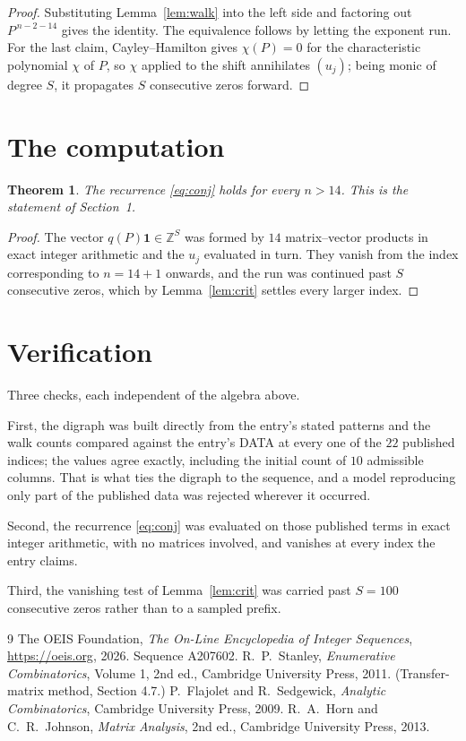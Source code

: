 \documentclass[11pt,a4paper]{article}
\theoremstyle{plain}
\newtheorem{theorem}{Theorem}
\theoremstyle{definition}
\begin{document}
\begin{proof}
Substituting Lemma~\ref{lem:walk} into the left side and factoring out
$P^{\,n-2-14}$ gives the identity. The equivalence follows by letting the exponent
run. For the last claim, Cayley--Hamilton gives $\chi(P)=0$ for the characteristic
polynomial $\chi$ of $P$, so $\chi$ applied to the shift annihilates $(u_j)$; being monic of
degree $S$, it propagates $S$ consecutive zeros forward.
\end{proof}

\section{The computation}

\begin{theorem}
The recurrence \eqref{eq:conj} holds for every $n>14$. This is the statement of
Section~1.
\end{theorem}

\begin{proof}
The vector $q(P)\mathbf{1}\in\mathbb{Z}^{S}$ was formed by $14$ matrix--vector
products in exact integer arithmetic and the $u_j$ evaluated in turn. They vanish from the
index corresponding to $n=14+1$ onwards, and the run was continued past $S$ consecutive
zeros, which by Lemma~\ref{lem:crit} settles every larger index.
\end{proof}

\section{Verification}

Three checks, each independent of the algebra above.

First, the digraph was built directly from the entry's stated patterns and the walk counts
compared against the entry's DATA at every one of the $22$ published indices; the
values agree exactly, including the initial count of $10$ admissible columns. That is
what ties the digraph to the sequence, and a model reproducing only part of the published
data was rejected wherever it occurred.

Second, the recurrence \eqref{eq:conj} was evaluated on those published terms in exact
integer arithmetic, with no matrices involved, and vanishes at every index the entry claims.

Third, the vanishing test of Lemma~\ref{lem:crit} was carried past $S=100$ consecutive
zeros rather than to a sampled prefix.

\begin{thebibliography}{9}
 The OEIS Foundation, \emph{The On-Line Encyclopedia of Integer
Sequences}, \url{https://oeis.org}, 2026. Sequence A207602.
 R.~P.~Stanley, \emph{Enumerative Combinatorics}, Volume 1, 2nd ed.,
Cambridge University Press, 2011. (Transfer-matrix method, Section 4.7.)
 P.~Flajolet and R.~Sedgewick, \emph{Analytic Combinatorics}, Cambridge
University Press, 2009.
 R.~A.~Horn and C.~R.~Johnson, \emph{Matrix Analysis}, 2nd ed., Cambridge
University Press, 2013.
\end{thebibliography}
\end{document}
